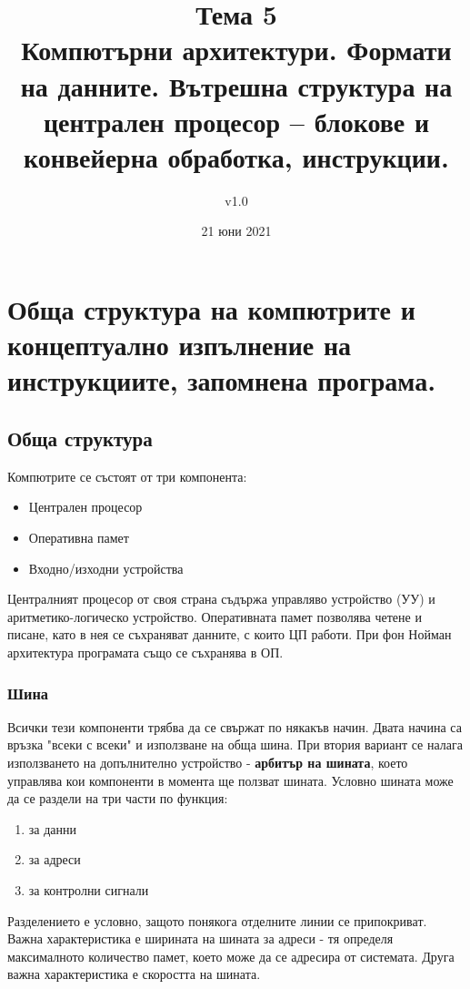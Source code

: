 \documentclass[fleqn,12pt]{article}
\title{Тема 5\\ Компютърни архитектури. Формати на данните. Вътрешна структура на централен процесор – блокове и конвейерна обработка, инструкции.}
\author{v1.0}
\date{21 юни 2021}
\begin{document}
\maketitle

\tableofcontents

\section{Обща структура на компютрите и концептуално изпълнение на инструкциите,
запомнена програма.}

\subsection{Обща структура}
Компютрите се състоят от три компонента:
\begin{itemize}
    \item Централен процесор
    \item Оперативна памет
    \item Входно/изходни устройства
\end{itemize}

Централният процесор от своя страна съдържа управляво устройство (УУ) и аритметико-логическо устройство. 
Оперативната памет позволява четене и писане, като в нея се съхраняват данните, с които ЦП работи.
При фон Нойман архитектура програмата също се съхранява в ОП.

\subsubsection{Шина}
Всички тези компоненти трябва да се свържат по някакъв начин. Двата начина са връзка "всеки с всеки" и използване 
на обща шина. При втория вариант се налага използването на допълнително устройство - \textbf{арбитър на шината}, 
което управлява кои компоненти в момента ще ползват шината. Условно шината може да се раздели на три части по функция:
\begin{enumerate}
    \item за данни
    \item за адреси
    \item за контролни сигнали
\end{enumerate}

Разделението е условно, защото понякога отделните линии се припокриват. Важна характеристика е ширината на шината за адреси - тя определя
максималното количество памет, което може да се адресира от системата. Друга важна характеристика е скоростта на шината.
\end{document}
